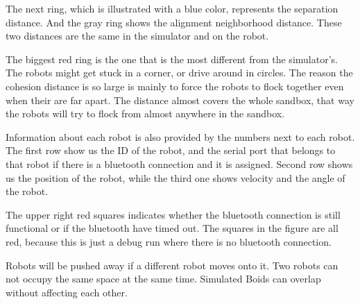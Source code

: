 The next ring, which is illustrated with a blue color, represents the separation distance. And the gray ring shows the alignment neighborhood distance. These two distances are the same in the simulator and on the robot.

The biggest red ring is the one that is the most different from the simulator's. The robots might get stuck in a corner, or drive around in circles.
The reason the cohesion distance is so large is mainly to force the robots to flock together even when their are far apart. The distance almost covers the whole sandbox, that way the robots will try to flock from almost anywhere in the sandbox.

Information about each robot is also provided by the numbers next to each robot.
The first row show us the ID of the robot, and the serial port that belongs to that robot if there is a bluetooth connection and it is assigned.
Second row shows us the position of the robot, while the third one shows velocity and the angle of the robot.

The upper right red squares indicates whether the bluetooth connection is still functional or if the bluetooth have timed out. The squares in the figure are all red, because this is just a debug run where there is no bluetooth connection.

Robots will be pushed away if a different robot moves onto it. Two robots can not occupy the same space at the same time. Simulated Boids can overlap without affecting each other.